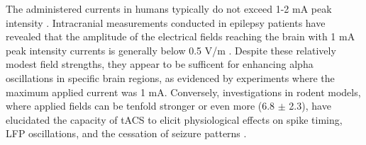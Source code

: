 \documentclass[../main.tex]{subfiles}
\begin{document}
The administered currents in humans typically do not exceed 1-2 mA peak intensity \citep{liu2018immediate,zaehle_transcranial_2010, helfrich2014entrainment, kasten2019integrating, zarubin_transient_2020}.
Intracranial measurements conducted in epilepsy patients have revealed that the amplitude of the electrical fields reaching the brain with 1 mA peak intensity currents is generally below 0.5 V/m \citep{liu2018immediate}.
Despite these relatively modest field strengths, they appear to be sufficent for enhancing alpha oscillations in specific brain regions, as evidenced by experiments where the maximum applied current was 1 mA. 
Conversely, investigations in rodent models, where applied fields can be tenfold stronger or even more (6.8 $\pm$ 2.3), have elucidated the capacity of tACS to elicit physiological effects on spike timing, LFP oscillations, and the cessation of seizure patterns \citep{liu2018immediate}.

\end{document}
